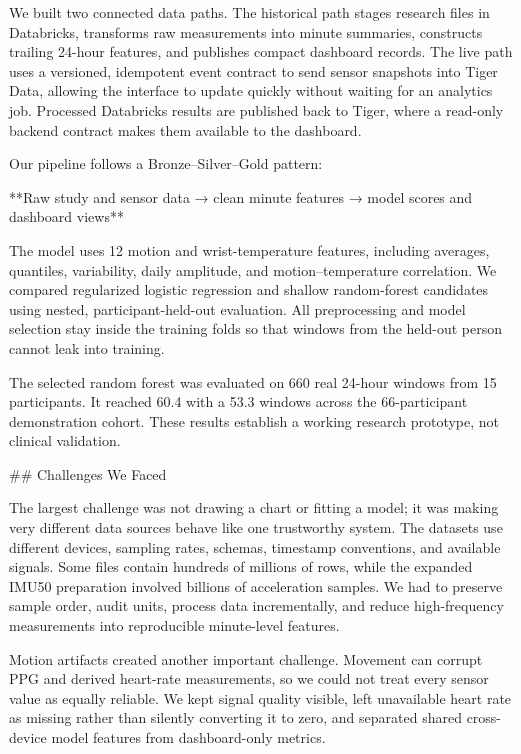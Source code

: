 We built two connected data paths. The historical path stages research files in
Databricks, transforms raw measurements into minute summaries, constructs
trailing 24-hour features, and publishes compact dashboard records. The live path
uses a versioned, idempotent event contract to send sensor snapshots into Tiger
Data, allowing the interface to update quickly without waiting for an analytics
job. Processed Databricks results are published back to Tiger, where a read-only
backend contract makes them available to the dashboard.

Our pipeline follows a Bronze–Silver–Gold pattern:

**Raw study and sensor data → clean minute features → model scores and dashboard views**

The model uses 12 motion and wrist-temperature features, including averages,
quantiles, variability, daily amplitude, and motion--temperature correlation.
We compared regularized logistic regression and shallow random-forest candidates
using nested, participant-held-out evaluation. All preprocessing and model
selection stay inside the training folds so that windows from the held-out person
cannot leak into training.

The selected random forest was evaluated on 660 real 24-hour windows from 15
participants. It reached 60.4%
with a 53.3%
windows across the 66-participant demonstration cohort. These results establish
a working research prototype, not clinical validation.

## Challenges We Faced

The largest challenge was not drawing a chart or fitting a model; it was making
very different data sources behave like one trustworthy system. The datasets use
different devices, sampling rates, schemas, timestamp conventions, and available
signals. Some files contain hundreds of millions of rows, while the expanded
IMU50 preparation involved billions of acceleration samples. We had to preserve
sample order, audit units, process data incrementally, and reduce high-frequency
measurements into reproducible minute-level features.

Motion artifacts created another important challenge. Movement can corrupt PPG
and derived heart-rate measurements, so we could not treat every sensor value as
equally reliable. We kept signal quality visible, left unavailable heart rate as
missing rather than silently converting it to zero, and separated shared
cross-device model features from dashboard-only metrics.

